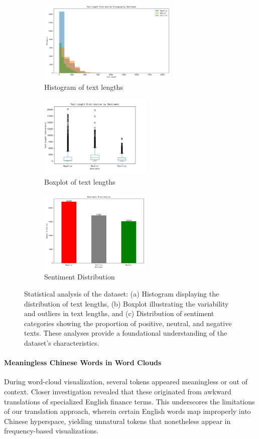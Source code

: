 \documentclass[12pt]{article}
\begin{document}
\begin{figure}[!ht]
	\centering
	\begin{subfigure}[b]{0.32\textwidth}
		\includegraphics[height=4cm]{text_length_histogram.png}
		\caption{Histogram of text lengths}
	\end{subfigure}
	\hfill
	\begin{subfigure}[b]{0.32\textwidth}
		\includegraphics[height=4cm]{text_length_boxplot.png}
		\caption{Boxplot of text lengths}
	\end{subfigure}
	\hfill
	\begin{subfigure}[b]{0.32\textwidth}
		\includegraphics[height=4cm]{sentiment_distribution.png}
		\caption{Sentiment Distribution}
	\end{subfigure}
	\caption{Statistical analysis of the dataset: (a) Histogram displaying the distribution of text lengths, (b) Boxplot illustrating the variability and outliers in text lengths, and (c) Distribution of sentiment categories showing the proportion of positive, neutral, and negative texts. These analyses provide a foundational understanding of the dataset's characteristics.}
	\label{fig:sentiment_distribution}
\end{figure}

\paragraph{Meaningless Chinese Words in Word Clouds}
During word-cloud visualization, several tokens appeared meaningless or out of context. Closer investigation revealed that these originated from awkward translations of specialized English finance terms. This underscores the limitations of our translation approach, wherein certain English words map improperly into Chinese hyperspace, yielding unnatural tokens that nonetheless appear in frequency-based visualizations.
\end{document}
